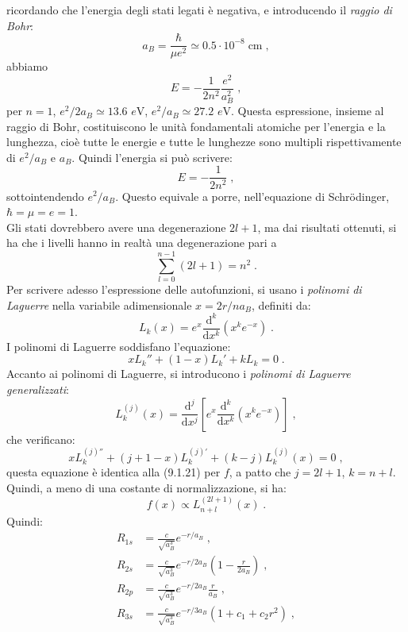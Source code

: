 \documentclass[10pt,a4paper]{report}
\theoremstyle{definition}
\numberwithin{equation}{section}
\newcommand{\diff}[1][]{\mathrm{d}#1}
\newcommand{\Sch}{Schrödinger}
\begin{document}
ricordando che l'energia degli stati legati è negativa, e introducendo il \textit{raggio di Bohr}:
\begin{equation}
a_B=\frac{\hbar}{\mu e^2}\simeq 0.5\cdot 10^{-8}\;\mathrm{cm}\;,
\end{equation}
abbiamo
\begin{equation}
E=-\frac{1}{2n^2}\frac{e^2}{a_B^2}\;,
\end{equation}
per $n=1$, $e^2/2a_B\simeq 13.6$ $e$V, $e^2/a_B\simeq 27.2$ $e$V. Questa espressione, insieme al raggio di Bohr, costituiscono le unità fondamentali atomiche per l'energia e la lunghezza, cioè tutte le energie e tutte le lunghezze sono multipli rispettivamente di $e^2/a_B$ e $a_B$. Quindi l'energia si può scrivere:
\begin{equation}
E=-\frac{1}{2n^2}\;,
\end{equation}
sottointendendo $e^2/a_B$. Questo equivale a porre, nell'equazione di \Sch , $\hbar=\mu=e=1$. \\
Gli stati dovrebbero avere una degenerazione $2l+1$, ma dai risultati ottenuti, si ha che i livelli hanno in realtà una degenerazione pari a
\begin{equation}
\sum_{l=0}^{n-1}(2l+1)=n^2\;.
\end{equation}
Per scrivere adesso l'espressione delle autofunzioni, si usano i \textit{polinomi di Laguerre} nella variabile adimensionale $x=2r/na_B$, definiti da:
\begin{equation}
L_k(x)=e^x\frac{\diff^k}{\diff{x^k}}(x^ke^{-x})\;.
\end{equation}
I polinomi di Laguerre soddisfano l'equazione:
\begin{equation}
xL_k''+(1-x)L_k'+kL_k=0\;.
\end{equation}
Accanto ai polinomi di Laguerre, si introducono i \textit{polinomi di Laguerre generalizzati}:
\begin{equation}
L_k^{(j)}(x)=\frac{\diff^j}{\diff{x^j}}\left[e^x\frac{\diff^k}{\diff{x^k}}(x^ke^{-x})\right]\;,
\end{equation}
che verificano:
\begin{equation}
xL_k^{(j)''}+(j+1-x)L_k^{(j)'}+(k-j)L_k^{(j)}(x)=0\;,
\end{equation}
questa equazione è identica alla (9.1.21) per $f$, a patto che $j=2l+1$, $k=n+l$. Quindi, a meno di una costante di normalizzazione, si ha:
\begin{equation}
f(x)\propto L_{n+l}^{(2l+1)}(x)\;.
\end{equation}
Quindi:
\begin{align*}
R_{1s}&=\frac{c}{\sqrt{a_B^3}}e^{-r/a_B}\;, \\
R_{2s}&=\frac{c}{\sqrt{a_B^3}}e^{-r/2a_B}\left(1-\frac{r}{2a_B}\right)\;, \\
R_{2p}&=\frac{c}{\sqrt{a_B^3}}e^{-r/2a_B}\frac{r}{a_B}\;, \\
R_{3s}&=\frac{c}{\sqrt{a_B^3}}e^{-r/3a_B}(1+c_1+c_2r^2)\;,
\end{align*}
\end{document}
